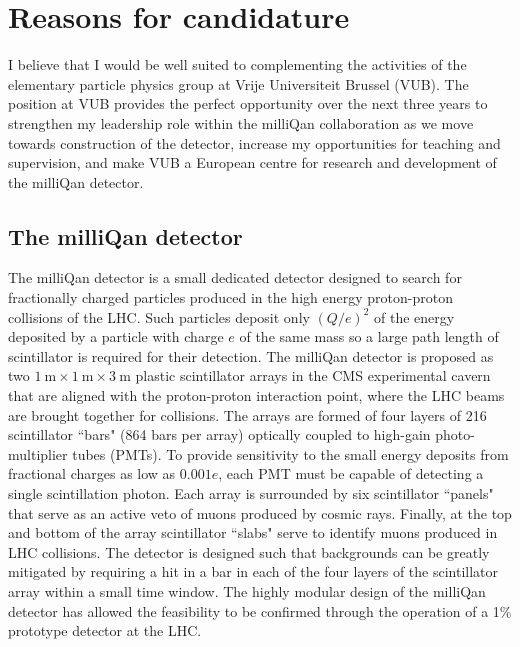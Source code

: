 \documentclass[11pt]{article}
\theoremstyle{plain} \numberwithin{equation}{section}
\theoremstyle{definition}
\begin{document}
\section*{Reasons for candidature}
\noindent 

I believe that I would be well suited to complementing the activities of the 
elementary particle physics group at Vrije Universiteit Brussel (VUB). 
The position at VUB provides the perfect opportunity over the next three years 
to strengthen my leadership role within the milliQan collaboration as we move 
towards construction of the detector, increase my opportunities for 
teaching and supervision, and make VUB a European centre
for research and development of the milliQan detector.

\subsection*{The milliQan detector}

The milliQan detector is a small dedicated detector 
designed to search for fractionally 
charged particles produced in the high energy proton-proton collisions of the LHC. 
Such particles deposit only $(Q/e)^2$ of the energy 
deposited by a particle with charge $e$ of
the same mass so a large path length of scintillator is required for
their detection. The milliQan detector is proposed as two 
$1~\mathrm{m}\times1~\mathrm{m}\times3~\mathrm{m}$ plastic scintillator arrays 
in the CMS experimental cavern that are aligned with the proton-proton 
interaction point, where the LHC beams are brought together for collisions. 
The arrays are formed of four layers of 216 scintillator ``bars" 
(864 bars per array) optically coupled to high-gain photo-multiplier tubes (PMTs). To provide 
sensitivity to the small energy deposits from fractional charges as low as $0.001 e$, 
each PMT must be capable of detecting a single scintillation photon. Each array is surrounded by six 
scintillator ``panels" that serve as an active veto of muons produced 
by cosmic rays. Finally, at the top and bottom of the array
scintillator ``slabs" serve to identify muons produced in LHC collisions. 
The detector is designed such that backgrounds can be greatly mitigated
by requiring a hit in a bar in each of the four layers 
of the scintillator array within a small time 
window. The highly modular design of the milliQan detector 
has allowed the feasibility to be confirmed through the operation 
of a 1\% prototype detector at the LHC.
\end{document}
